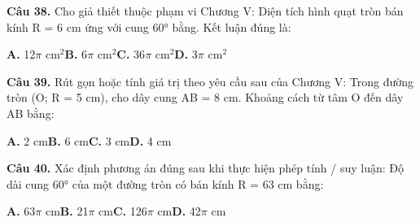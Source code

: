 \documentclass[11pt,a4paper]{article}
\begin{document}
\textbf{\color{primary} Câu 38.} Cho giả thiết thuộc phạm vi Chương V: Diện tích hình quạt tròn bán kính R = 6 cm ứng với cung 60° bằng. Kết luận đúng là:\par
\hspace*{1.5em}\textbf{A.} 12$\pi$ cm$^2$\quad\quad \textbf{B.} 6$\pi$ cm$^2$\quad\quad \textbf{C.} 36$\pi$ cm$^2$\quad\quad \textbf{D.} 3$\pi$ cm$^2$\par\vspace{2pt}
\textbf{\color{primary} Câu 39.} Rút gọn hoặc tính giá trị theo yêu cầu sau của Chương V: Trong đường tròn (O; R = 5 cm), cho dây cung AB = 8 cm. Khoảng cách từ tâm O đến dây AB bằng:\par
\hspace*{1.5em}\textbf{A.} 2 cm\quad\quad \textbf{B.} 6 cm\quad\quad \textbf{C.} 3 cm\quad\quad \textbf{D.} 4 cm\par\vspace{2pt}
\textbf{\color{primary} Câu 40.} Xác định phương án đúng sau khi thực hiện phép tính / suy luận: Độ dài cung 60° của một đường tròn có bán kính R = 63 cm bằng:\par
\hspace*{1.5em}\textbf{A.} 63$\pi$ cm\quad\quad \textbf{B.} 21$\pi$ cm\quad\quad \textbf{C.} 126$\pi$ cm\quad\quad \textbf{D.} 42$\pi$ cm\par\vspace{2pt}
\end{document}
